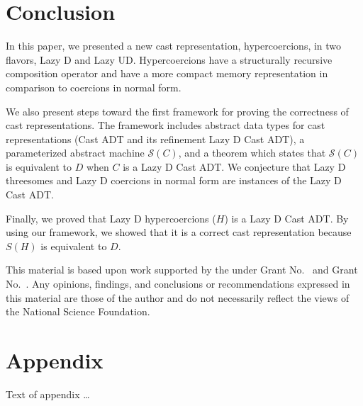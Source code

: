 \documentclass[acmsmall,review,anonymous]{acmart}\settopmatter{printfolios=true,printccs=false,printacmref=false}
\newcommand{\effCEK}[1]{\ensuremath{\mathcal{S}(#1)}}
\begin{document}
\section{Conclusion} \label{sec:conclude}

In this paper, we presented a new cast representation, hypercoercions,
in two flavors, Lazy D and Lazy UD. Hypercoercions have a structurally
recursive composition operator and have a more compact memory
representation in comparison to coercions in normal form.

We also present steps toward the first framework for proving the
correctness of cast representations.
%
The framework includes abstract data types for cast representations
(Cast ADT and its refinement Lazy D Cast ADT), a parameterized abstract machine
\effCEK{C}, and a theorem which states that \effCEK{C} is equivalent
to $D$ when $C$ is a Lazy D Cast ADT.
%
%
We conjecture that Lazy D
threesomes and Lazy D coercions in normal form are instances of the
Lazy D Cast ADT.

Finally, we proved that Lazy D hypercoercions ($H$) is a Lazy D Cast
ADT. By using our framework, we showed that it is a correct cast
representation because $S(H)$ is equivalent to $D$.

\begin{acks}                            %
  This material is based upon work supported by the
   under Grant
  No.~ and Grant
  No.~.  Any opinions, findings, and
  conclusions or recommendations expressed in this material are those
  of the author and do not necessarily reflect the views of the
  National Science Foundation.
\end{acks}





\appendix
\section{Appendix}

Text of appendix \ldots
\end{document}
